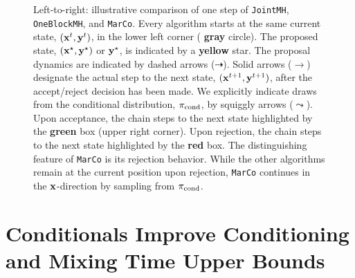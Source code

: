 \documentclass[onefignum,onetabnum]{siamonline250211}
\renewcommand{\d} {{\rm d}}                                %
\newcommand{\bfx}{{\bf x}}
\newcommand{\bfy}{{\bf y}}
\newcommand{\pcond}{\pi_{\rm cond}}
\newcommand{\MarCo}{\textnormal{\texttt{MarCo}}\xspace}
\newcommand{\Joint}{\textnormal{\texttt{JointMH}}\xspace}
\newcommand{\OneblockMCMC}{\textnormal{\texttt{OneBlockMH}}\xspace}
\begin{document}
\begin{figure}


\caption{Left-to-right: illustrative comparison of one step of \Joint, \OneblockMCMC, and \MarCo.  
Every algorithm starts at the same current state, $(\bfx^t, \bfy^t)$, in the lower left corner ({\color{gray} \bf gray} circle). 
The proposed state, $(\bfx^\star, \bfy^\star)$ or $\bfy^\star$, is indicated by a {\color{colorpropose} \bf yellow} star. 
%
The  proposal dynamics are indicated by dashed arrows ($\dashrightarrow$). 
Solid arrows ($\rightarrow$) designate the actual step to the next state, $(\bfx^{t+1}, \bfy^{t+1})$, after the accept/reject decision has been made. 
We explicitly indicate draws from the conditional distribution, $\pcond$, by squiggly arrows ($\leadsto$). 
Upon acceptance, the chain steps to the next state highlighted by the {\color{coloraccept}\bf green} box (upper right corner). 
Upon rejection, the chain steps to the next state highlighted by the {\color{colorreject}\bf red} box.  
The distinguishing feature of \MarCo is its rejection behavior. 
While the other algorithms remain at the current position upon rejection, \MarCo continues in the $\bfx$-direction by sampling from $\pcond$.
}
\label{fig:chain_comparison}
\end{figure}
  
%
\section{Conditionals Improve Conditioning and Mixing Time Upper Bounds}
\label{sec:theory_marco_vs_joint}
\end{document}
